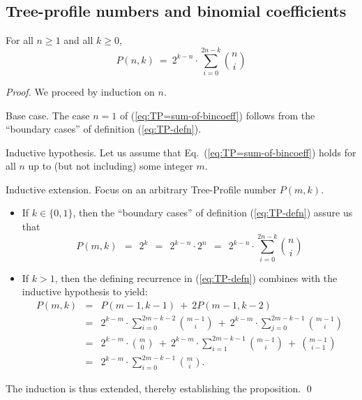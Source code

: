 \subsection{Tree-profile numbers and binomial coefficients}

\begin{prop}
\label{thm:TP=sum-of-bincoeff}
For all $n \geq 1$ and all $k \geq 0$,
\begin{equation}
\label{eq:TP=sum-of-bincoeff}
P(n,k) \ = \ 2^{k-n} \cdot \sum_{i=0}^{2n-k} {n \choose i}
\end{equation}
\end{prop}

\begin{proof}
We proceed by induction on $n$.

\medskip

\noindent
{\sf Base case.}
The case $n=1$ of (\ref{eq:TP=sum-of-bincoeff}) follows from the ``boundary cases'' of definition (\ref{eq:TP-defn}).

\medskip

\noindent
{\sf Inductive hypothesis.}
Let us assume that Eq.~(\ref{eq:TP=sum-of-bincoeff}) holds for all $n$ up to (but not including) some integer $m$.  

\noindent
{\sf Inductive extension}.
Focus on an arbitrary Tree-Profile number $P(m,k)$.
\begin{itemize}
\item
If $k \in \{0,1\}$, then the ``boundary cases'' of definition (\ref{eq:TP-defn}) assure us that
\[
P(m,k) \ \ = \ \ 2^k \ \ = \ \ 2^{k-n} \cdot 2^n \ \ = \ \  2^{k-n} \cdot \sum_{i=0}^{2n-k} {n \choose i}
\]

\item
If $k > 1$, then the defining recurrence in (\ref{eq:TP-defn}) combines with the inductive hypothesis to yield:
\begin{eqnarray*}
\nonumber
P(m, k) & = &
   P(m-1, k-1) \ + \ 2 P(m-1, k-2) \\
        & = &
   2^{k-m} \cdot \sum_{i=0}^{2m-k-2} {m-1 \choose i}
   \ + \
   2^{k-m} \cdot \sum_{j=0}^{2m-k-1} {m-1 \choose i} \\
        & = &
   2^{k-m} \cdot {m \choose 0}
   \ + \
   2^{k-m} \cdot \sum_{i=1}^{2m-k-1} {m-1 \choose i}
   \ + \
   {{m-1} \choose {i-1}} \\
        & = &
   2^{k-m} \cdot \sum_{i=0}^{2m-k-1} {m \choose i}.
\end{eqnarray*}
\end{itemize}
The induction is thus extended, thereby establishing the proposition.
\qed
\end{proof}

